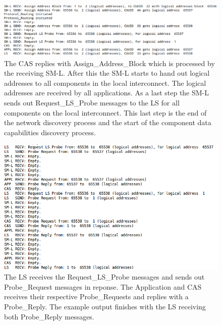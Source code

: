 \begin{figure}[ht]
    \centering
    \includegraphics[width=\textwidth]{figures/code_part_2}
    \caption{The CAS replies with Assign\_Address\_Block which is processed by
    the receiving SM-L. After this the SM-L starts to hand out logical
addresses to all components in the local interconnect. The logical addresses
are received by all applications. As a last step the SM-L sends out
Request\_LS\_Probe messages to the LS for all components on the local
interconnect. This last step is the end of the network discovery process and
the start of the component data capabilities discovery process.}
    \label{fig:code_part_2}
\end{figure}

\begin{figure}[ht]
    \centering
    \includegraphics[width=\textwidth]{figures/code_part_3}
    \caption{The LS receives the Request\_LS\_Probe messages and sends out
    Probe\_Request messages in reponse. The Application and CAS receives their
    respective Probe\_Requests and replies with a Probe\_Reply. The example
output finishes with the LS receiving both Probe\_Reply messages.}
    \label{fig:code_part_3}
\end{figure}

